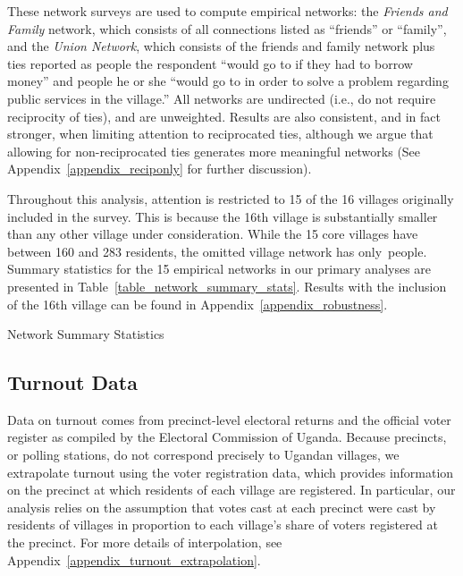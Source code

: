 \documentclass[12pt]{article}
\begin{document}
These network surveys are used to compute empirical networks: the \emph{Friends and Family} network, which consists of all connections listed as ``friends'' or ``family'', and the \emph{Union Network}, which consists of the friends and family network plus ties reported as people the respondent ``would go to if they had to borrow money'' and people he or she ``would go to in order to solve a problem regarding public services in the village.'' All networks are undirected (i.e., do not require reciprocity of ties), and are unweighted. Results are also consistent, and in fact stronger, when limiting attention to reciprocated ties, although we argue that allowing for non-reciprocated ties generates more meaningful networks (See Appendix~\ref{appendix_reciponly} for further discussion).

Throughout this analysis, attention is restricted to 15 of the 16 villages originally included in the survey. This is because the 16th village is substantially smaller than any other village under consideration. While the 15 core villages have between 160 and 283 residents, the omitted village network has only~people. Summary statistics for the 15 empirical networks in our primary analyses are presented in Table~\ref{table_network_summary_stats}. Results with the inclusion of the 16th village can be found in Appendix~\ref{appendix_robustness}.

\begin{table}
\centering
\caption{Network Summary Statistics}\label{table_network_summary_stats}

\end{table}


\subsection{Turnout Data}\label{section_data_turnout}

Data on turnout comes from precinct-level electoral returns and the official voter register as compiled by the Electoral Commission of Uganda. Because precincts, or polling stations, do not correspond precisely to Ugandan villages, we extrapolate turnout using the voter registration data, which provides information on the precinct at which residents of each village are registered. In particular, our analysis relies on the assumption that votes cast at each precinct were cast by residents of villages in proportion to each village's share of voters registered at the precinct.  For more details of interpolation, see Appendix~\ref{appendix_turnout_extrapolation}.
\end{document}
